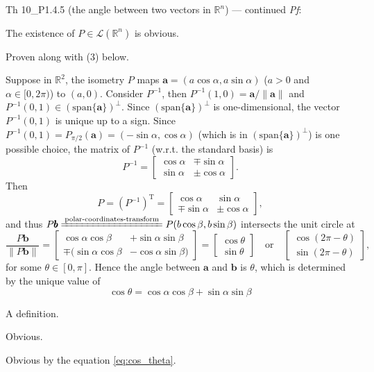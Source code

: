 \documentclass{article}
\begin{document}
\begin{Th}{Th 10\_P1.4.5 (the angle between two vectors in $\mathbb{R}^n$) — continued}
    \textit{Pf}:
    \begin{compactenum}
        \item The existence of $P\in\mathcal{L}(\mathbb{R}^n)$ is obvious. 
        \item Proven along with (3) below.
        \item Suppose in $\mathbb{R}^2$, the isometry $P$ maps $\pmb{a} = (a\cos\alpha, a\sin\alpha)$ ($a>0$ and $\alpha\in [0,2\pi)$) to $(a, 0)$. Consider $P^{-1}$, then $P^{-1}(1, 0) = \pmb{a} / \|\pmb{a}\|$ and $P^{-1}(0, 1) \in (\text{span}\{\pmb{a}\})^\perp$. Since $(\text{span}\{\pmb{a}\})^\perp$ is one-dimensional, the vector $P^{-1}(0, 1)$ is unique up to a sign. Since $P^{-1}(0,1) = P_{\pi/2}(\pmb{a}) = (-\sin\alpha, \cos\alpha)$ (which is in $(\text{span}\{\pmb{a}\})^\perp$) is one possible choice, the matrix of $P^{-1}$ (w.r.t. the standard basis) is
        $$ P^{-1} = \begin{bmatrix}
            \cos\alpha & \mp\sin\alpha \\
            \sin\alpha & \pm\cos\alpha
        \end{bmatrix}. $$
        Then
        $$ P = (P^{-1})^\mathrm{T} = \begin{bmatrix}
            \cos\alpha & \sin\alpha \\
            \mp\sin\alpha & \pm\cos\alpha
        \end{bmatrix}, $$
        and thus $P\pmb{b} \xlongequal{\text{polar-coordinates-transform}} P(b\cos\beta, b\sin\beta)$ intersects the unit circle at
        $$ \frac{P\pmb{b}}{\|P\pmb{b}\|} = \left[\begin{aligned}
            \cos\alpha\cos\beta &+ \sin\alpha\sin\beta \\
            \mp(\sin\alpha\cos\beta &- \cos\alpha\sin\beta)
        \end{aligned}\right] = \left[\begin{aligned}
            \cos\theta \\
            \sin\theta
        \end{aligned} \right] \quad \text{or} \quad \left[\begin{aligned}
            \cos(2\pi - \theta) \\
            \sin(2\pi - \theta)
        \end{aligned}\right], $$
        for some $\theta\in [0, \pi]$. Hence the angle between $\pmb{a}$ and $\pmb{b}$ is $\theta$, which is determined by the unique value of 
        \begin{equation}
            \cos\theta = \cos\alpha\cos\beta + \sin\alpha\sin\beta
            \label{eq:cos_theta}
        \end{equation}
        \item A definition.
        \item Obvious.
        \item Obvious by the equation \eqref{eq:cos_theta}.
    \end{compactenum}
\end{Th}
\end{document}
